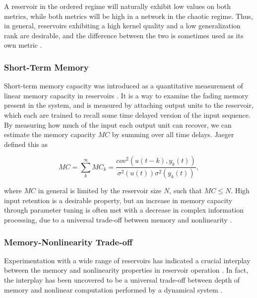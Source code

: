A reservoir in the ordered regime will naturally exhibit low values on both
metrics, while both metrics will be high in a network in the chaotic
regime. Thus, in general, reservoirs exhibiting a high kernel quality and a low
generalization rank are desirable, and the difference between the two is
sometimes used as its own metric \cite{busing_connectivity_2010}.

\subsubsection{Short-Term Memory}

Short-term memory capacity was introduced as a quantitative measurement of
linear memory capacity in reservoirs \cite{jaeger_short_2002}. It is a way to
examine the fading memory present in the system, and is measured by attaching
output units to the reservoir, which each are trained to recall some time
delayed version of the input sequence. By measuring how much of the input each
output unit can recover, we can estimate the memory capacity $MC$ by summing
over all time delays. Jaeger defined this as

\begin{equation}
  MC =
  \sum_{k}^{\infty}MC_{k} =
  \frac
  {cov^2(u(t-k), y_k(t))}
  {\sigma^{2}(u(t))\sigma^{2}(y_{k}(t))}
  ,
  \label{stm-eq}
\end{equation}

where $MC$ in general is limited by the reservoir size $N$, such that $MC \leq
N$. High input retention is a desirable property, but an increase in memory
capacity through parameter tuning is often met with a decrease in complex
information processing, due to a universal trade-off between memory and
nonlinearity \cite{dambre_information_2012}.



\subsubsection{Memory-Nonlinearity Trade-off}

Experimentation with a wide range of reservoirs has indicated a crucial
interplay between the memory and nonlinearity properties in reservoir operation
\cite{verstraeten_memory_2010}. In fact, the interplay has been uncovered to be
a universal trade-off between depth of memory and nonlinear computation
performed by a dynamical system \cite{dambre_information_2012}.

